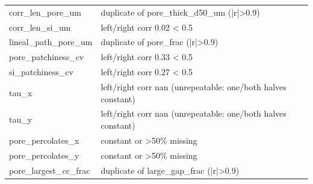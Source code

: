\documentclass[11pt,a4paper]{article}
\begin{document}
\begin{longtable}{lp{10cm}}
corr\_len\_pore\_um & duplicate of pore\_thick\_d50\_um (|r|>0.9) \\
corr\_len\_si\_um & left/right corr 0.02 < 0.5 \\
lineal\_path\_pore\_um & duplicate of pore\_frac (|r|>0.9) \\
pore\_patchiness\_cv & left/right corr 0.33 < 0.5 \\
si\_patchiness\_cv & left/right corr 0.27 < 0.5 \\
tau\_x & left/right corr nan (unrepeatable: one/both halves constant) \\
tau\_y & left/right corr nan (unrepeatable: one/both halves constant) \\
pore\_percolates\_x & constant or >50\% missing \\
pore\_percolates\_y & constant or >50\% missing \\
pore\_largest\_cc\_frac & duplicate of large\_gap\_frac (|r|>0.9) \\
\end{longtable}
\normalsize
\newpage
\end{document}
